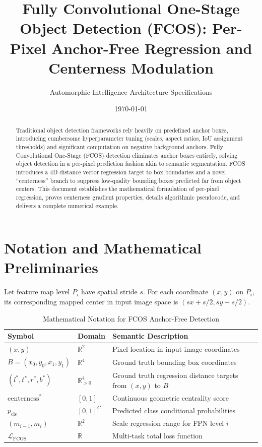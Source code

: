 \documentclass[11pt,a4paper]{article}
\title{Fully Convolutional One-Stage Object Detection (FCOS): Per-Pixel Anchor-Free Regression and Centerness Modulation}
\author{Automorphic Intelligence Architecture Specifications}
\date{\today}
\theoremstyle{definition}
\begin{document}
\maketitle

\begin{abstract}
Traditional object detection frameworks rely heavily on predefined anchor boxes, introducing cumbersome hyperparameter tuning (scales, aspect ratios, IoU assignment thresholds) and significant computation on negative background anchors. Fully Convolutional One-Stage (FCOS) detection eliminates anchor boxes entirely, solving object detection in a per-pixel prediction fashion akin to semantic segmentation. FCOS introduces a 4D distance vector regression target to box boundaries and a novel ``centerness'' branch to suppress low-quality bounding boxes predicted far from object centers. This document establishes the mathematical formulation of per-pixel regression, proves centerness gradient properties, details algorithmic pseudocode, and delivers a complete numerical example.
\end{abstract}

\section{Notation and Mathematical Preliminaries}

Let feature map level $P_i$ have spatial stride $s$. For each coordinate $(x, y)$ on $P_i$, its corresponding mapped center in input image space is $(s x + s/2, s y + s/2)$.

\begin{table}[h]
\centering
\caption{Mathematical Notation for FCOS Anchor-Free Detection}
\begin{tabular}{lll}
\toprule
\textbf{Symbol} & \textbf{Domain} & \textbf{Semantic Description} \\
\midrule
$(x, y)$ & $\mathbb{R}^2$ & Pixel location in input image coordinates \\
$B = (x_0, y_0, x_1, y_1)$ & $\mathbb{R}^4$ & Ground truth bounding box coordinates \\
$(l^*, t^*, r^*, b^*)$ & $\mathbb{R}_{> 0}^4$ & Ground truth regression distance targets from $(x, y)$ to $B$ \\
$\text{centerness}^*$ & $[0, 1]$ & Continuous geometric centrality score \\
$p_{\text{cls}}$ & $[0, 1]^C$ & Predicted class conditional probabilities \\
$(m_{i-1}, m_i)$ & $\mathbb{R}^2$ & Scale regression range for FPN level $i$ \\
$\mathcal{L}_{\text{FCOS}}$ & $\mathbb{R}$ & Multi-task total loss function \\
\bottomrule
\end{tabular}
\end{table}
\end{document}
